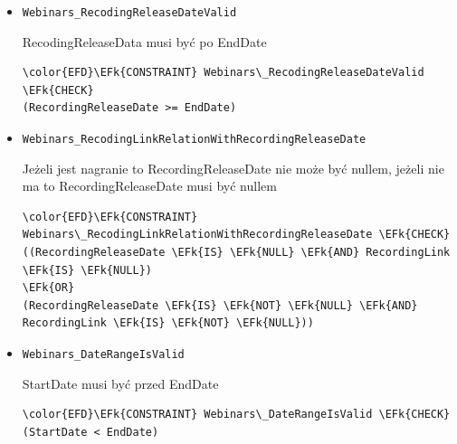 \documentclass[11pt]{article}
\newcommand{\EFk}[1]{\textcolor{EFk}{\textbf{#1}}} %
\begin{document}
\begin{itemize}
\item \texttt{Webinars\_RecodingReleaseDateValid}

RecodingReleaseData musi być po EndDate
\begin{Code}
\begin{Verbatim}
\color{EFD}\EFk{CONSTRAINT} Webinars\_RecodingReleaseDateValid \EFk{CHECK}
(RecordingReleaseDate >= EndDate)
\end{Verbatim}
\end{Code}
\item \texttt{Webinars\_RecodingLinkRelationWithRecordingReleaseDate}

Jeżeli jest nagranie to RecordingReleaseDate nie może być nullem, jeżeli nie ma to RecordingReleaseDate musi być nullem
\begin{Code}
\begin{Verbatim}
\color{EFD}\EFk{CONSTRAINT} Webinars\_RecodingLinkRelationWithRecordingReleaseDate \EFk{CHECK}
((RecordingReleaseDate \EFk{IS} \EFk{NULL} \EFk{AND} RecordingLink \EFk{IS} \EFk{NULL})
\EFk{OR}
(RecordingReleaseDate \EFk{IS} \EFk{NOT} \EFk{NULL} \EFk{AND} RecordingLink \EFk{IS} \EFk{NOT} \EFk{NULL}))
\end{Verbatim}
\end{Code}
\item \texttt{Webinars\_DateRangeIsValid}

StartDate musi być przed EndDate
\begin{Code}
\begin{Verbatim}
\color{EFD}\EFk{CONSTRAINT} Webinars\_DateRangeIsValid \EFk{CHECK}
(StartDate < EndDate)
\end{Verbatim}
\end{Code}
\end{itemize}
\end{document}
